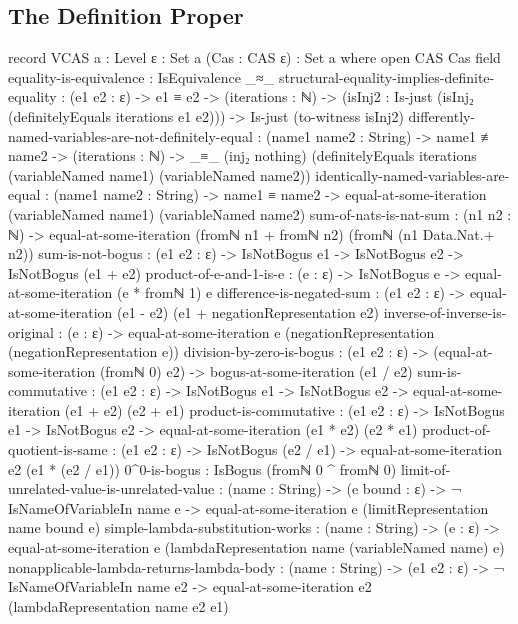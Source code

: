 \documentclass{report}
\begin{document}
\subsection{The Definition Proper}

\begin{code}
record VCAS {a : Level} {ε : Set a} (Cas : CAS ε) : Set a where
  open CAS Cas
  field
    equality-is-equivalence : IsEquivalence _≈_
    structural-equality-implies-definite-equality :
      (e1 e2 : ε) ->
      e1 ≡ e2 ->
      (iterations : ℕ) ->
      (isInj2 : Is-just (isInj₂ (definitelyEquals iterations e1 e2))) ->
      Is-just (to-witness isInj2)
    differently-named-variables-are-not-definitely-equal :
      (name1 name2 : String) ->
      name1 ≢ name2 ->
      (iterations : ℕ) ->
      _≡_ (inj₂ nothing)
          (definitelyEquals iterations
                            (variableNamed name1)
                            (variableNamed name2))
    identically-named-variables-are-equal :
      (name1 name2 : String) ->
      name1 ≡ name2 ->
      equal-at-some-iteration (variableNamed name1) (variableNamed name2)
    sum-of-nats-is-nat-sum :
      (n1 n2 : ℕ) ->
      equal-at-some-iteration (fromℕ n1 + fromℕ n2) (fromℕ (n1 Data.Nat.+ n2))
    sum-is-not-bogus :
      (e1 e2 : ε) ->
      IsNotBogus e1 ->
      IsNotBogus e2 ->
      IsNotBogus (e1 + e2)
    product-of-e-and-1-is-e :
      (e : ε) ->
      IsNotBogus e ->
      equal-at-some-iteration (e * fromℕ 1) e
    difference-is-negated-sum :
      (e1 e2 : ε) ->
      equal-at-some-iteration (e1 - e2)
                              (e1 + negationRepresentation e2)
    inverse-of-inverse-is-original :
      (e : ε) ->
      equal-at-some-iteration e (negationRepresentation (negationRepresentation e))
    division-by-zero-is-bogus :
      (e1 e2 : ε) ->
      (equal-at-some-iteration (fromℕ 0) e2) ->
      bogus-at-some-iteration (e1 / e2)
    sum-is-commutative :
      (e1 e2 : ε) ->
      IsNotBogus e1 ->
      IsNotBogus e2 ->
      equal-at-some-iteration (e1 + e2) (e2 + e1)
    product-is-commutative :
      (e1 e2 : ε) ->
      IsNotBogus e1 ->
      IsNotBogus e2 ->
      equal-at-some-iteration (e1 * e2) (e2 * e1)
    product-of-quotient-is-same :
      (e1 e2 : ε) ->
      IsNotBogus (e2 / e1) ->
      equal-at-some-iteration e2 (e1 * (e2 / e1))
    0^0-is-bogus : IsBogus (fromℕ 0 ^ fromℕ 0)
    limit-of-unrelated-value-is-unrelated-value :
      (name : String) ->
      (e bound : ε) ->
      ¬ IsNameOfVariableIn name e ->
      equal-at-some-iteration e (limitRepresentation name bound e)
    simple-lambda-substitution-works :
      (name : String) ->
      (e : ε) ->
      equal-at-some-iteration e (lambdaRepresentation name (variableNamed name) e)
    nonapplicable-lambda-returns-lambda-body :
      (name : String) ->
      (e1 e2 : ε) ->
      ¬ IsNameOfVariableIn name e2 ->
      equal-at-some-iteration e2 (lambdaRepresentation name e2 e1)
\end{code}
\end{document}
